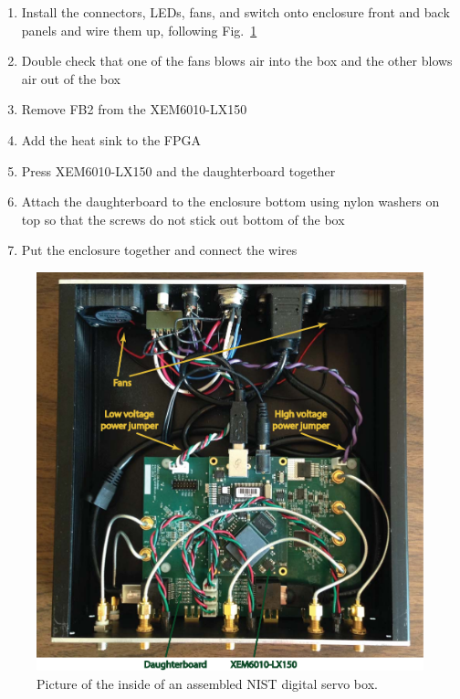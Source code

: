 \documentclass[aip,rsi,preprint,graphicx]{revtex4-1}
\begin{document}
\begin{enumerate}
\item Install the connectors, LEDs, fans, and switch onto enclosure front and back panels and wire them up, following Fig.~\ref{fig:DigitalServoInsidePic}
\item Double check that one of the fans blows air into the box and the other blows air out of the box
\item Remove FB2 from the XEM6010-LX150
\item Add the heat sink to the FPGA
\item Press XEM6010-LX150 and the daughterboard together
\item Attach the daughterboard to the enclosure bottom using nylon washers on top so that the screws do not stick out bottom of the box
\item Put the enclosure together and connect the wires
\end{enumerate}

\begin{figure}
\begin{center}
\includegraphics[width=1.0\textwidth]{Figs/DigitalServoInsideWithLabels}
\caption{\label{fig:DigitalServoInsidePic}Picture of the inside of an assembled NIST digital servo box.}
\end{center}
\end{figure}
\end{document}
